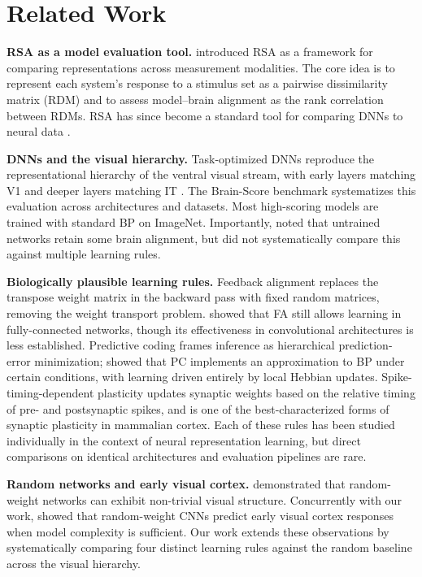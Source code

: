 \documentclass[10pt,twocolumn]{article}
\begin{document}
\section{Related Work}

\textbf{RSA as a model evaluation tool.} \citet{kriegeskorte2008} introduced RSA as a framework for comparing representations across measurement modalities. The core idea is to represent each system's response to a stimulus set as a pairwise dissimilarity matrix (RDM) and to assess model--brain alignment as the rank correlation between RDMs. RSA has since become a standard tool for comparing DNNs to neural data \citep{yamins2016, schrimpf2020}.

\textbf{DNNs and the visual hierarchy.} Task-optimized DNNs reproduce the representational hierarchy of the ventral visual stream, with early layers matching V1 and deeper layers matching IT \citep{yamins2016}. The Brain-Score benchmark \citep{schrimpf2020} systematizes this evaluation across architectures and datasets. Most high-scoring models are trained with standard BP on ImageNet. Importantly, \citet{schrimpf2020} noted that untrained networks retain some brain alignment, but did not systematically compare this against multiple learning rules.

\textbf{Biologically plausible learning rules.} Feedback alignment \citep{lillicrap2016} replaces the transpose weight matrix in the backward pass with fixed random matrices, removing the weight transport problem. \citet{lillicrap2016} showed that FA still allows learning in fully-connected networks, though its effectiveness in convolutional architectures is less established. Predictive coding \citep{rao1999} frames inference as hierarchical prediction-error minimization; \citet{whittington2017} showed that PC implements an approximation to BP under certain conditions, with learning driven entirely by local Hebbian updates. Spike-timing-dependent plasticity \citep{bi1998} updates synaptic weights based on the relative timing of pre- and postsynaptic spikes, and is one of the best-characterized forms of synaptic plasticity in mammalian cortex. Each of these rules has been studied individually in the context of neural representation learning, but direct comparisons on identical architectures and evaluation pipelines are rare.

\textbf{Random networks and early visual cortex.} \citet{saxe2011} demonstrated that random-weight networks can exhibit non-trivial visual structure. Concurrently with our work, \citet{truzzi2025} showed that random-weight CNNs predict early visual cortex responses when model complexity is sufficient. Our work extends these observations by systematically comparing four distinct learning rules against the random baseline across the visual hierarchy.
\end{document}
